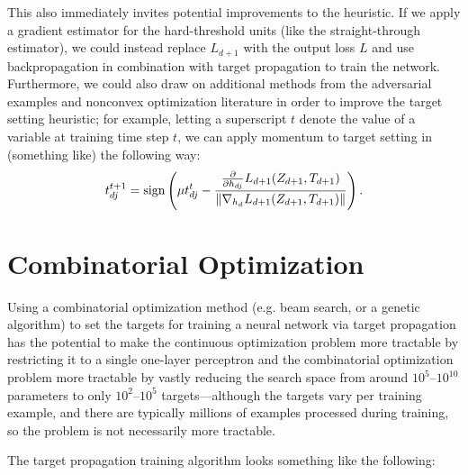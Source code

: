 \documentclass[12pt,letterpaper]{article}
\begin{document}
This also immediately invites potential improvements to the heuristic. If we apply a gradient estimator for the hard-threshold units (like the straight-through estimator), we could instead replace $L_{d+1}$ with the output loss $L$ and use backpropagation in combination with target propagation to train the network. Furthermore, we could also draw on additional methods from the adversarial examples and nonconvex optimization literature in order to improve the target setting heuristic; for example, letting a superscript $t$ denote the value of a variable at training time step $t$, we can apply momentum to target setting in (something like) the following way:
$$t_{dj}^{t+1} = \textrm{sign}\left(\mu t_{dj}^{t} - {{\partial \over \partial h_{dj}}L_{d+1}(Z_{d+1}, T_{d+1}) \over \Vert \nabla_{h_{d}}L_{d+1}(Z_{d+1}, T_{d+1}) \Vert}\right).$$



\section{Combinatorial Optimization}

Using a combinatorial optimization method (e.g. beam search, or a genetic algorithm) to set the targets for training a neural network via target propagation has the potential to make the continuous optimization problem more tractable by restricting it to a single one-layer perceptron and the combinatorial optimization problem more tractable by vastly reducing the search space from around $10^{5}$--$10^{10}$ parameters to only $10^{2}$--$10^{5}$ targets---although the targets vary per training example, and there are typically millions of examples processed during training, so the problem is not necessarily more tractable. 

The target propagation training algorithm looks something like the following:

\begin{algorithm}
\caption{}
\begin{algorithmic}  
\ENDFOR
{}
\ENDFOR
\ENDFOR
\end{algorithmic}
\end{algorithm} 
\end{document}
